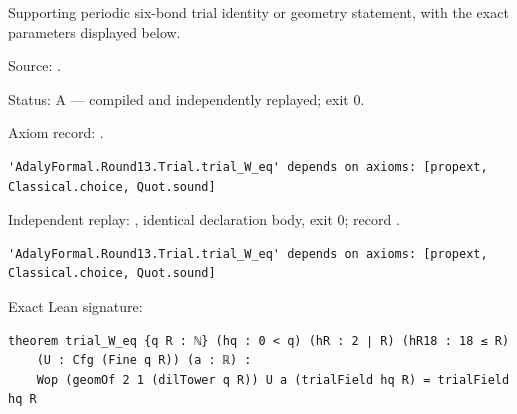 \begin{theorem}[bp-375]
\label{bp-375}
\leanok
Supporting periodic six-bond trial identity or geometry statement, with the exact parameters displayed below.

\par Source: \texttt{}.
\par Status: A — compiled and independently replayed; exit 0.
\par Axiom record: \texttt{}.
\begin{verbatim}
'AdalyFormal.Round13.Trial.trial_W_eq' depends on axioms: [propext, Classical.choice, Quot.sound]
\end{verbatim}
\par Independent replay: \texttt{}, identical declaration body, exit 0; record \texttt{}.
\begin{verbatim}
'AdalyFormal.Round13.Trial.trial_W_eq' depends on axioms: [propext, Classical.choice, Quot.sound]
\end{verbatim}
\par Exact Lean signature:
\begin{verbatim}
theorem trial_W_eq {q R : ℕ} (hq : 0 < q) (hR : 2 ∣ R) (hR18 : 18 ≤ R)
    (U : Cfg (Fine q R)) (a : ℝ) :
    Wop (geomOf 2 1 (dilTower q R)) U a (trialField hq R) = trialField hq R
\end{verbatim}
\end{theorem}

